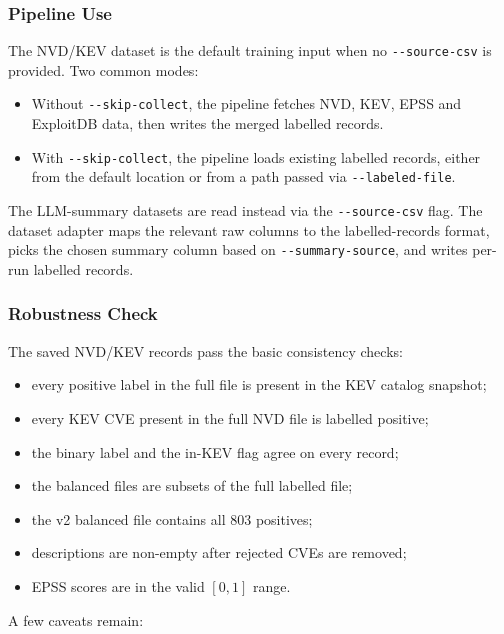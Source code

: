 \documentclass[11pt]{article}
\begin{document}
\subsubsection{Pipeline Use}

The NVD/KEV dataset is the default training input when no
\verb|--source-csv| is provided. Two common modes:

\begin{itemize}
    \item Without \verb|--skip-collect|, the pipeline fetches NVD,
    KEV, EPSS and ExploitDB data, then writes the merged labelled
    records.
    \item With \verb|--skip-collect|, the pipeline loads existing
    labelled records, either from the default location or from a path
    passed via \verb|--labeled-file|.
\end{itemize}

The LLM-summary datasets are read instead via the \verb|--source-csv|
flag. The dataset adapter maps the relevant raw columns to the
labelled-records format, picks the chosen summary column based on
\verb|--summary-source|, and writes per-run labelled records.

\subsubsection{Robustness Check}

The saved NVD/KEV records pass the basic consistency checks:

\begin{itemize}
    \item every positive label in the full file is present in the KEV
    catalog snapshot;
    \item every KEV CVE present in the full NVD file is labelled
    positive;
    \item the binary label and the in-KEV flag agree on every record;
    \item the balanced files are subsets of the full labelled file;
    \item the v2 balanced file contains all $803$ positives;
    \item descriptions are non-empty after rejected CVEs are removed;
    \item EPSS scores are in the valid $[0, 1]$ range.
\end{itemize}

A few caveats remain:
\end{document}
